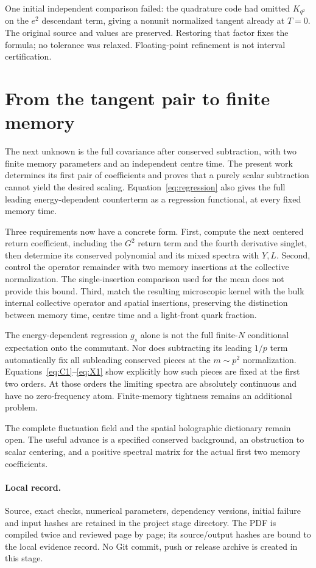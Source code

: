\documentclass[11pt,a4paper]{article}
\begin{document}
One initial independent comparison failed: the quadrature code had
omitted $K_{q^2}$ on the $e^2$ descendant term, giving a nonunit
normalized tangent already at $T=0$. The original source and values
are preserved. Restoring that factor fixes the formula; no tolerance
was relaxed. Floating-point refinement is not interval certification.

\newpage
\section{From the tangent pair to finite memory}
The next unknown is the full covariance after conserved subtraction,
with two finite memory parameters and an independent centre time.
The present work determines its first pair of coefficients and proves
that a purely scalar subtraction cannot yield the desired scaling.
Equation~\eqref{eq:regression} also gives the full leading
energy-dependent counterterm as a regression functional, at every
fixed memory time.

Three requirements now have a concrete form. First, compute the
next centered return coefficient, including the $G^2$ return term
and the fourth derivative singlet, then determine its conserved
polynomial and its mixed spectra with $Y,L$. Second, control the
operator remainder with two memory insertions at the collective
normalization. The single-insertion comparison used for the mean
does not provide this bound. Third, match the resulting microscopic
kernel with the bulk internal collective operator and spatial
insertions, preserving the distinction between memory time, centre
time and a light-front quark fraction.

The energy-dependent regression $g_s$ alone is not the full finite-$N$
conditional expectation onto the commutant. Nor does subtracting its
leading $1/p$ term automatically fix all subleading conserved pieces
at the $m\sim p^2$ normalization. Equations~\eqref{eq:C1}--\eqref{eq:X1}
show explicitly how such pieces are fixed at the first two orders.
At those orders the limiting spectra are absolutely continuous and
have no zero-frequency atom. Finite-memory tightness remains an
additional problem.

The complete fluctuation field and the spatial holographic dictionary
remain open. The useful advance is a specified conserved background,
an obstruction to scalar centering, and a positive spectral matrix
for the actual first two memory coefficients.

\paragraph{Local record.}
Source, exact checks, numerical parameters, dependency versions,
initial failure and input hashes are retained in the project stage
directory. The PDF is compiled twice and reviewed page by page;
its source/output hashes are bound to the local evidence record.
No Git commit, push or release archive is created in this stage.
\end{document}
